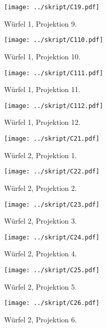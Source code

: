 \begin{figure}[htbp]
	\begin{minipage}{0.5\textwidth} 
	\texttt{[image: ../skript/C19.pdf]}
	\caption{Würfel 1, Projektion 9.}
	\end{minipage}
	\hfill
	\begin{minipage}{0.5\textwidth}
	\texttt{[image: ../skript/C110.pdf]}
	\caption{Würfel 1, Projektion 10.} 
	\end{minipage}
\end{figure}
 \clearpage
\begin{figure}[htbp]
	\begin{minipage}{0.5\textwidth} 
	\texttt{[image: ../skript/C111.pdf]}
	\caption{Würfel 1, Projektion 11.}
	\end{minipage}
	\hfill
	\begin{minipage}{0.5\textwidth}
	\texttt{[image: ../skript/C112.pdf]}
	\caption{Würfel 1, Projektion 12.}
	\end{minipage}
\end{figure}
\begin{figure}[htbp]
	\begin{minipage}{0.5\textwidth} 
	\texttt{[image: ../skript/C21.pdf]}
	\caption{Würfel 2, Projektion 1.}
	\end{minipage}
	\hfill
	\begin{minipage}{0.5\textwidth}
	\texttt{[image: ../skript/C22.pdf]}
	\caption{Würfel 2, Projektion 2.}
	\end{minipage}
\end{figure}

\begin{figure}[htbp]
	\begin{minipage}{0.5\textwidth} 
	\texttt{[image: ../skript/C23.pdf]}
	\caption{Würfel 2, Projektion 3.}
	\end{minipage}
	\hfill
	\begin{minipage}{0.5\textwidth}
	\texttt{[image: ../skript/C24.pdf]}
	\caption{Würfel 2, Projektion 4.}
	\end{minipage}
\end{figure}

\begin{figure}[htbp]
	\begin{minipage}{0.5\textwidth} 
	\texttt{[image: ../skript/C25.pdf]}
	\caption{Würfel 2, Projektion 5.}
	\end{minipage}
	\hfill
	\begin{minipage}{0.5\textwidth}
	\texttt{[image: ../skript/C26.pdf]}
	\caption{Würfel 2, Projektion 6.}
	\end{minipage}
\end{figure}

